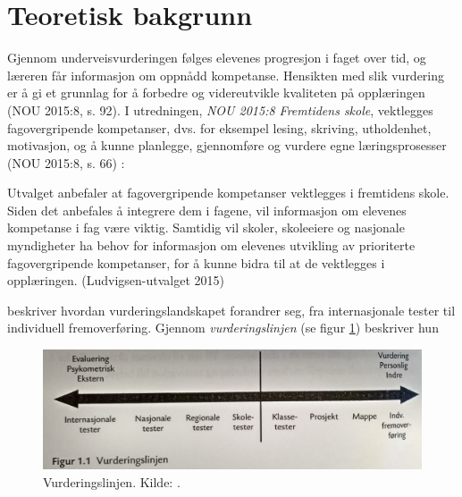 \documentclass[main.tex]{subfiles}
\begin{document}
\section*{Teoretisk bakgrunn}
Gjennom underveisvurderingen følges elevenes progresjon i faget over tid, og læreren får informasjon
om oppnådd kompetanse. Hensikten med slik vurdering er å gi et grunnlag for å forbedre og videreutvikle  
kvaliteten på opplæringen (NOU 2015:8, s. 92). I utredningen, \emph{NOU 2015:8 Fremtidens skole}, vektlegges
fagovergripende kompetanser, dvs. for eksempel lesing, skriving, utholdenhet, motivasjon, og å kunne planlegge, 
gjennomføre og vurdere egne læringsprosesser (NOU 2015:8, s. 66) :
\begin{displayquote}
Utvalget anbefaler at fagovergripende kompetanser vektlegges i fremtidens skole. Siden det  
anbefales å integrere dem i fagene, vil informasjon om elevenes kompetanse i fag være viktig.  
Samtidig vil skoler, skoleeiere og nasjonale myndigheter ha behov for informasjon om elevenes utvikling av 
prioriterte fagovergripende kompetanser, for å kunne bidra til at de vektlegges i opplæringen. 
(Ludvigsen-utvalget 2015)
\end{displayquote}
 beskriver hvordan vurderingslandskapet forandrer seg, fra internasjonale tester til
individuell fremoverføring. Gjennom \emph{vurderingslinjen} (se figur \ref{fig:smit09}) beskriver hun
\begin{figure}[h!]
\includegraphics[scale = 0.1]{../figures/vurderingslinjen.png}
\caption{Vurderingslinjen. Kilde: \protect{}.}
\label{fig:smit09}
\end{figure}
\end{document}
